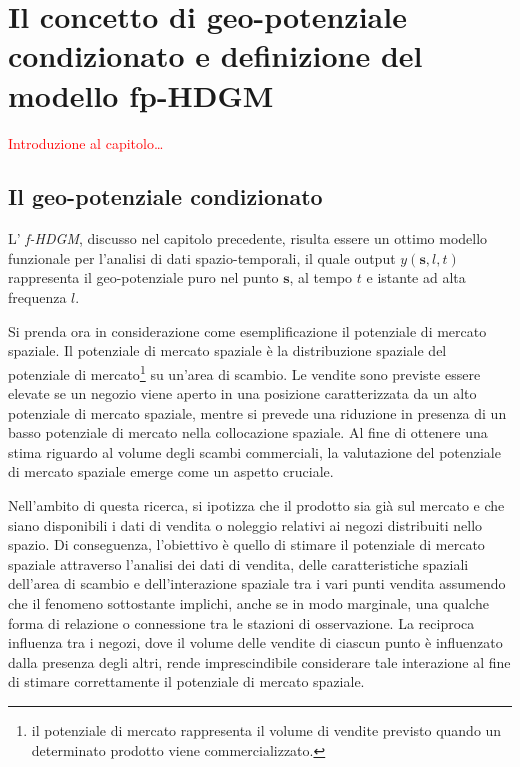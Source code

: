 \chapter[Il concetto di geo-potenziale condizionato e il modello fp-HDGM]{Il concetto di geo-potenziale condizionato e definizione del modello fp-HDGM}

\textcolor{red}{Introduzione al capitolo\dots}

\section[Il geo-potenziale condizionato]{Il geo-potenziale condizionato}
L' \textit{f-HDGM}, discusso nel capitolo precedente, risulta essere un ottimo modello funzionale per l'analisi di dati spazio-temporali, il quale output $y(\mathbf{s}, l, t)$ rappresenta il geo-potenziale puro nel punto $\mathbf{s}$, al tempo $t$ e istante ad alta frequenza $l$.
\par Si prenda ora in considerazione come esemplificazione il potenziale di mercato spaziale. Il potenziale di mercato spaziale è la distribuzione spaziale del potenziale di mercato\footnote{il potenziale di mercato rappresenta il volume di vendite previsto quando un determinato prodotto viene commercializzato.} su un'area di scambio.
Le vendite sono previste essere elevate se un negozio viene aperto in una posizione caratterizzata da un alto potenziale di mercato spaziale, mentre si prevede una riduzione in presenza di un basso potenziale di mercato nella collocazione spaziale.
Al fine di ottenere una stima riguardo al volume degli scambi commerciali, la valutazione del potenziale di mercato spaziale emerge come un aspetto cruciale.
\par Nell'ambito di questa ricerca, si ipotizza che il prodotto sia già sul mercato e che siano disponibili i dati di vendita o noleggio relativi ai negozi distribuiti nello spazio. Di conseguenza, l'obiettivo è quello di stimare il potenziale di mercato spaziale attraverso l'analisi dei dati di vendita, delle caratteristiche spaziali dell'area di scambio e dell'interazione spaziale tra i vari punti vendita assumendo che il fenomeno sottostante implichi, anche se in modo marginale, una qualche forma di relazione o connessione tra le stazioni di osservazione. La reciproca influenza tra i negozi, dove il volume delle vendite di ciascun punto è influenzato dalla presenza degli altri, rende imprescindibile considerare tale interazione al fine di stimare correttamente il potenziale di mercato spaziale.

